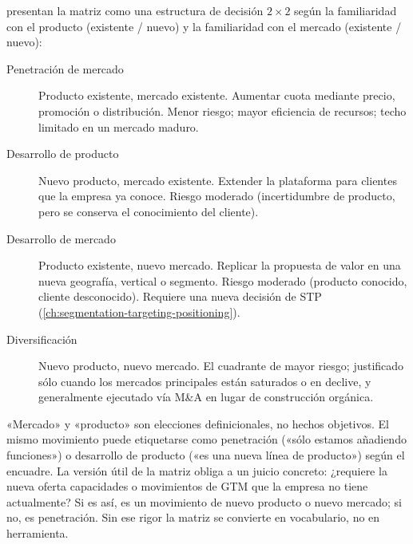 \textcite{kotler2021} presentan la matriz como una estructura de decisión \(2\times2\)
según la familiaridad con el producto (existente / nuevo) y la familiaridad con el mercado
(existente / nuevo):
\begin{description}
  \item[Penetración de mercado] Producto existente, mercado existente. Aumentar cuota
        mediante precio, promoción o distribución. Menor riesgo; mayor eficiencia de
        recursos; techo limitado en un mercado maduro.
  \item[Desarrollo de producto] Nuevo producto, mercado existente. Extender la plataforma
        para clientes que la empresa ya conoce. Riesgo moderado (incertidumbre de producto,
        pero se conserva el conocimiento del cliente).
  \item[Desarrollo de mercado] Producto existente, nuevo mercado. Replicar la propuesta de
        valor en una nueva geografía, vertical o segmento. Riesgo moderado (producto
        conocido, cliente desconocido). Requiere una nueva decisión de STP
        (\cref{ch:segmentation-targeting-positioning}).
  \item[Diversificación] Nuevo producto, nuevo mercado. El cuadrante de mayor riesgo;
        justificado sólo cuando los mercados principales están saturados o en declive, y
        generalmente ejecutado vía M\&A en lugar de construcción orgánica.
\end{description}

«Mercado» y «producto» son elecciones definicionales, no hechos objetivos. El mismo
movimiento puede etiquetarse como penetración («sólo estamos añadiendo funciones») o
desarrollo de producto («es una nueva línea de producto») según el encuadre. La versión útil
de la matriz obliga a un juicio concreto: ¿requiere la nueva oferta capacidades o
movimientos de GTM que la empresa no tiene actualmente? Si es así, es un movimiento de
nuevo producto o nuevo mercado; si no, es penetración. Sin ese rigor la matriz se convierte
en vocabulario, no en herramienta.

